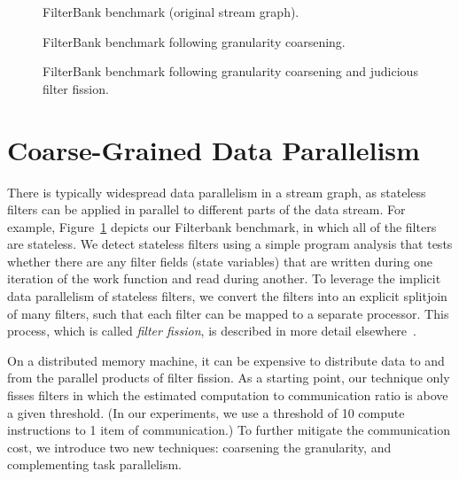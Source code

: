 \begin{figure}[t]
\caption{FilterBank benchmark (original stream graph).\label{fig:filterbank-orig}}
\end{figure}

\begin{figure}[t]
\caption{FilterBank benchmark following granularity
coarsening.\label{fig:filterbank-coarse}}
\end{figure}

\begin{figure}[t]
\caption{FilterBank benchmark following granularity coarsening and
judicious filter fission.\label{fig:filterbank-dup}}
\end{figure}

\section{Coarse-Grained Data Parallelism}

There is typically widespread data parallelism in a stream graph, as
stateless filters can be applied in parallel to different parts of the
data stream.  For example, Figure~\ref{fig:filterbank-orig} depicts
our Filterbank benchmark, in which all of the filters are stateless.
We detect stateless filters using a simple program analysis that tests
whether there are any filter fields (state variables) that are written
during one iteration of the work function and read during another.  To
leverage the implicit data parallelism of stateless filters, we
convert the filters into an explicit splitjoin of many filters, such
that each filter can be mapped to a separate processor.  This process,
which is called {\it filter fission}, is described in more detail
elsewhere~\cite{gordon02asplos}.

On a distributed memory machine, it can be expensive to distribute
data to and from the parallel products of filter fission.  As a
starting point, our technique only fisses filters in which the
estimated computation to communication ratio is above a given
threshold.  (In our experiments, we use a threshold of 10 compute
instructions to 1 item of communication.)  To further mitigate the
communication cost, we introduce two new techniques: coarsening the
granularity, and complementing task parallelism.


